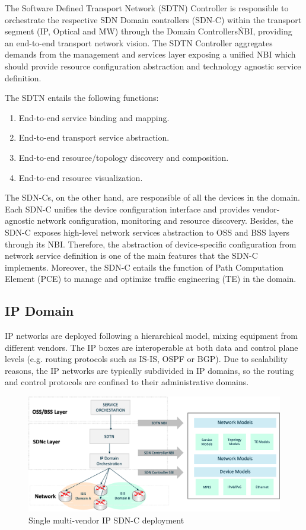 \documentclass[a4paper,fleqn]{cas-dc}
\begin{document}
The Software Defined Transport Network (SDTN) Controller is responsible to orchestrate the respective SDN Domain controllers (SDN-C) within the transport segment (IP, Optical and MW) through the Domain Controllers\'NBI, providing an end-to-end transport network vision. The SDTN Controller aggregates demands from the management and services layer exposing a unified NBI which should provide resource configuration abstraction and technology agnostic service definition. 

The SDTN entails the following functions: 
\begin{enumerate}
    \item End-to-end service binding and mapping.
    \item End-to-end transport service abstraction.
    \item End-to-end resource/topology discovery and composition.
    \item End-to-end resource visualization.
\end{enumerate}

The SDN-Cs, on the other hand, are responsible of all the devices in the domain. Each SDN-C unifies the device configuration interface and provides vendor-agnostic network configuration, monitoring and resource discovery. Besides, the SDN-C exposes high-level network services abstraction to OSS and BSS layers through its NBI. Therefore, the abstraction of device-specific configuration from network service definition is one of the main features that the SDN-C implements. Moreover, the SDN-C entails the function of Path Computation Element (PCE) to manage and optimize traffic engineering (TE) in the domain.

\subsection {IP Domain}
\label{section:ip}
IP networks are deployed following a hierarchical model, mixing equipment from different vendors. The IP boxes are interoperable at both data and control plane levels (e.g. routing protocols such as IS-IS, OSPF or BGP). Due to scalability reasons, the IP networks are typically subdivided in IP domains, so the routing and control protocols are confined to their administrative domains.

\begin{figure}
	\centering
		\includegraphics[scale=0.5]{figs/ifusion_multidomain_2.png}
	\caption{Single multi-vendor IP SDN-C deployment}
	\label{FIG:2}
\end{figure}
\end{document}

